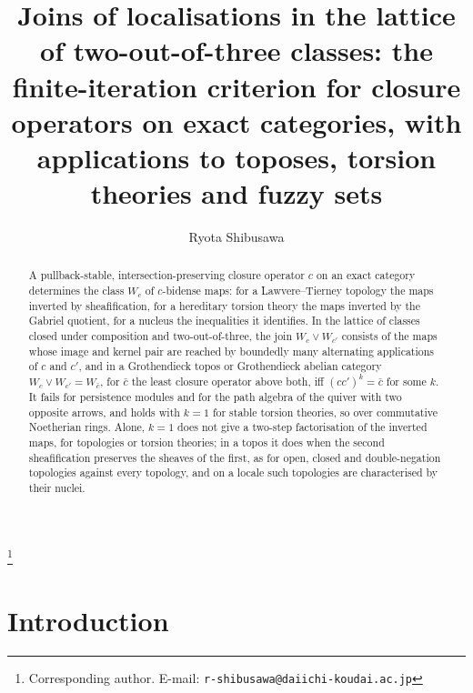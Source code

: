 \documentclass[11pt]{amsart}
\theoremstyle{definition}
\begin{document}
\title[Joins of localisations and the sameness lattice]{Joins of localisations in the lattice of two-out-of-three classes: the finite-iteration criterion for closure operators on exact categories, with applications to toposes, torsion theories and fuzzy sets}
\author{Ryota Shibusawa}
\thanks{Corresponding author. E-mail: \texttt{r-shibusawa@daiichi-koudai.ac.jp}}
\address{Daiichi Institute of Technology}

\begin{abstract}
A pullback-stable, intersection-preserving closure operator $c$ on an exact
category determines the class $W_c$ of $c$-bidense
maps: for a Lawvere--Tierney topology the maps inverted by sheafification,
for a hereditary torsion theory the maps inverted by the Gabriel quotient, for a nucleus the inequalities it
identifies. In the lattice of classes closed under composition and
two-out-of-three, the join $W_c\vee W_{c'}$ consists of the maps whose
image and kernel pair are reached by boundedly many alternating
applications of $c$ and $c'$, and in a Grothendieck topos or Grothendieck
abelian category $W_c\vee W_{c'}=W_{\bar c}$, for $\bar c$ the least
closure operator above both, iff $(cc')^k=\bar c$ for some $k$. It
fails for persistence modules and for the path algebra of the quiver with
two opposite arrows, and holds with $k=1$ for stable torsion theories, so over commutative Noetherian rings.
Alone, $k=1$ does not give a two-step factorisation of the inverted
maps, for topologies or torsion theories; in a topos it does when the
second sheafification preserves the sheaves of the first, as for open,
closed and double-negation topologies against every topology, and on a
locale such topologies are characterised by their nuclei.
\end{abstract}

\maketitle

\section{Introduction}
\end{document}

